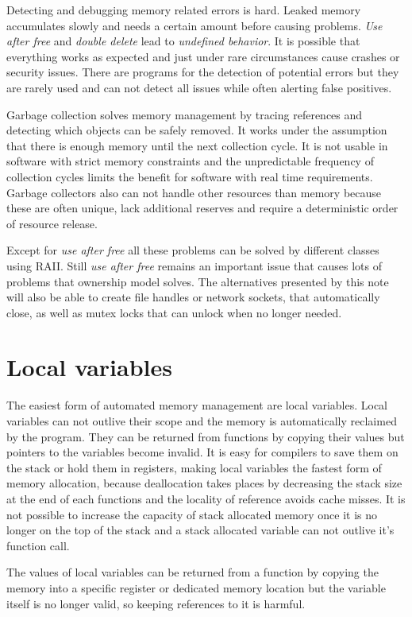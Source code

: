 \documentclass[conference,twocolumn]{IEEEtran}
\begin{document}
Detecting and debugging memory related errors is hard. Leaked memory accumulates slowly and needs a certain amount before causing problems. \emph{Use after free} and \emph{double delete} lead to \emph{undefined behavior}. It is possible that everything works as expected and just under rare circumstances cause crashes or security issues. There are programs for the detection of potential errors but they are rarely used and can not detect all issues while often alerting false positives.

Garbage collection solves memory management by tracing references and detecting which objects can be safely removed. It works under the assumption that there is enough memory until the next collection cycle. It is not usable in software with strict memory constraints and the unpredictable frequency of collection cycles limits the benefit for software with real time requirements.
Garbage collectors also can not handle other resources than memory because these are often unique, lack additional reserves and require a deterministic order of resource release.


Except for \emph{use after free} all these problems can be solved by different classes using RAII. Still \emph{use after free} remains an important issue that causes lots of problems that ownership model solves. The alternatives presented by this note will also be able to create file handles or network sockets, that automatically close, as well as mutex locks that can unlock when no longer needed.


\section{Local variables}
The easiest form of automated memory management are local variables. Local variables can not outlive their scope and the memory is automatically reclaimed by the program. They can be returned from functions by copying their values but pointers to the variables become invalid. It is easy for compilers to save them on the stack or hold them in registers, making local variables the fastest form of memory allocation, because deallocation takes places by decreasing the stack size at the end of each functions and the locality of reference avoids cache misses. It is not possible to increase the capacity of stack allocated memory once it is no longer on the top of the stack and a stack allocated variable can not outlive it's function call.

The values of local variables can be returned from a function by copying the memory into a specific register or dedicated memory location but the variable itself is no longer valid, so keeping references to it is harmful.
\end{document}
